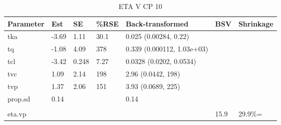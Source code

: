 \begin{table}
\centering\centering
\caption{ETA V CP 10}
\centering
\fontsize{8}{10}\selectfont
\begin{tabular}[t]{lllllll}
\toprule
\textbf{Parameter} & \textbf{Est} & \textbf{SE} & \textbf{\%RSE} & \textbf{Back-transformed} & \textbf{BSV} & \textbf{Shrinkage}\\
\midrule
tka & -3.69 & 1.11 & 30.1 & 0.025 (0.00284, 0.22) &  & \\
\midrule
tq & -1.08 & 4.09 & 378 & 0.339 (0.000112, 1.03e+03) &  & \\
\midrule
tcl & -3.42 & 0.248 & 7.27 & 0.0328 (0.0202, 0.0534) &  & \\
\midrule
tvc & 1.09 & 2.14 & 198 & 2.96 (0.0442, 198) &  & \\
\midrule
tvp & 1.37 & 2.06 & 151 & 3.93 (0.0689, 225) &  & \\
\midrule
prop.sd & 0.14 &  &  & 0.14 &  & \\
\midrule\\
eta.vp &  &  &  &  & 15.9 & 29.9\%=\\
\bottomrule
\end{tabular}
\end{table}